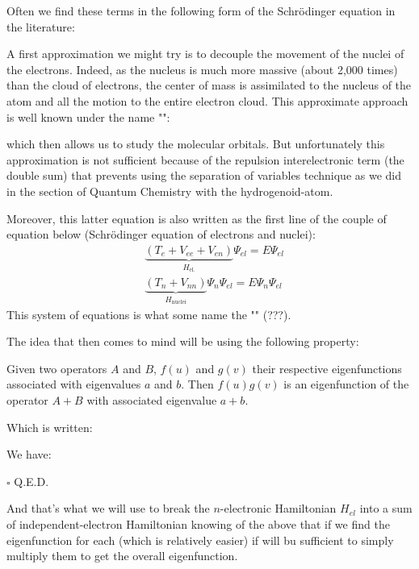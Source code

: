 	Often we find these terms in the following form of the Schrödinger equation in the literature:
	
	A first approximation we might try is to decouple the movement of the nuclei of the electrons. Indeed, as the nucleus is much more massive (about 2,000 times) than the cloud of electrons, the center of mass is assimilated to the nucleus of the atom and all the motion to the entire electron cloud. This approximate approach is well known under the name "":
	
	which then allows us to study the molecular orbitals. But unfortunately this approximation is not sufficient because of the repulsion interelectronic term (the double sum) that prevents using the separation of variables technique as we did in the section of Quantum Chemistry with the hydrogenoid-atom.
	
	Moreover, this latter equation is also written as the first line of the couple of equation below (Schrödinger equation of electrons and nuclei):
	\begin{subequations}
		\begin{align}
		&\underbrace{(T_e+V_{ee}+V_{en})}_{H_{\text{el.}}}\Psi_{el}=E\Psi_{el}\\
		&\underbrace{(T_n+V_{nn})}_{H_{\text{nuclei}}}\Psi_n\Psi_{el}=E\Psi_n\Psi_{el}
		\end{align}
	\end{subequations}
	This system of equations is what some name the "" (???).
	
	The idea that then comes to mind will be using the following property:
	
	Given two operators $A$ and $B$, $f (u)$ and $g(v)$ their respective eigenfunctions associated with eigenvalues $a$ and $b$. Then $f (u) g (v)$ is an eigenfunction of the operator $A + B$ with associated eigenvalue $a + b$.

	Which is written:
	
			
	\begin{dem}
		We have:
		
		\begin{flushright}
			$\square$  Q.E.D.
		\end{flushright}
	\end{dem}
	And that's what we will use to break the $n$-electronic Hamiltonian $H_{el}$ into a sum of independent-electron Hamiltonian knowing of the above that if we find the eigenfunction for each (which is relatively easier) if will bu sufficient to simply multiply them to get the overall eigenfunction.

